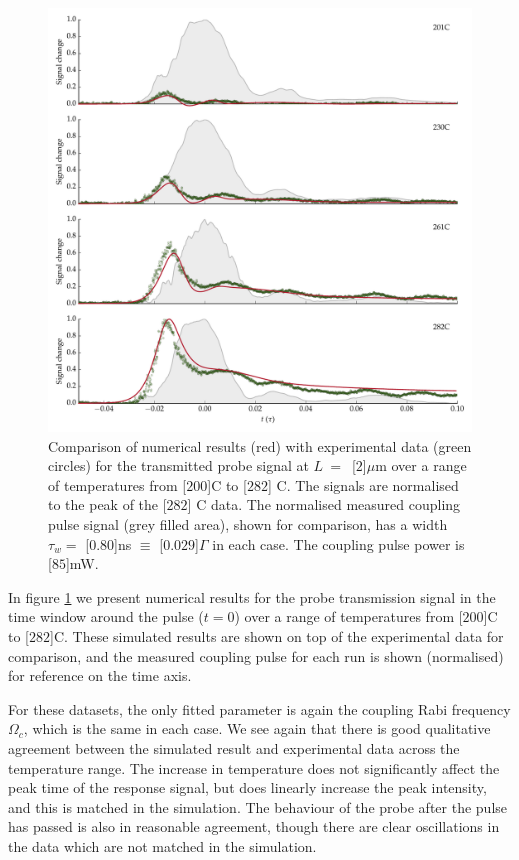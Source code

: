     \begin{figure}[p]
    \includegraphics[width=\linewidth]{figs/06_simultons/mb_vee2g_exp_plot_temp_282_fig1.pdf}
    \caption{
    Comparison of numerical results (red) with experimental data (green circles)
    for the transmitted probe signal at $L~=$~\unit[$2$]{$\mu$m} over a range of
    temperatures from \unit[$200$]{\textdegree C} to \unit[$282$]{\textdegree
    C}. The signals are normalised to the peak of the \unit[$282$]{\textdegree
    C} data. The normalised measured coupling pulse signal (grey filled area),
    shown for comparison, has a width $\tau_w = $ \unit[$0.80$]{ns} $ \equiv $
    \unit[$0.029$]{$\Gamma$} in each case. The coupling pulse power is
    \unit[$85$]{mW}.
    } 
    \label{fig:exp_result_temp_dep} 
    \end{figure}

    In figure \ref{fig:exp_result_temp_dep} we present numerical results for the
    probe transmission signal in the time window around the pulse ($t\!=\!0$)
    over a range of temperatures from \unit[$200$]{\textdegree C} to
    \unit[$282$]{\textdegree C}. These simulated results are shown on top of the
    experimental data for comparison, and the measured coupling pulse for each
    run is shown (normalised) for reference on the time axis.

    For these datasets, the only fitted parameter is again the coupling Rabi
    frequency $\Omega_c$, which is the same in each case. We see again that
    there is good qualitative agreement between the simulated result and
    experimental data across the temperature range. The increase in temperature
    does not significantly affect the peak time of the response signal, but does
    linearly increase the peak intensity, and this is matched in the simulation.
    The behaviour of the probe after the pulse has passed is also in reasonable
    agreement, though there are clear oscillations in the data which are not
    matched in the simulation.


